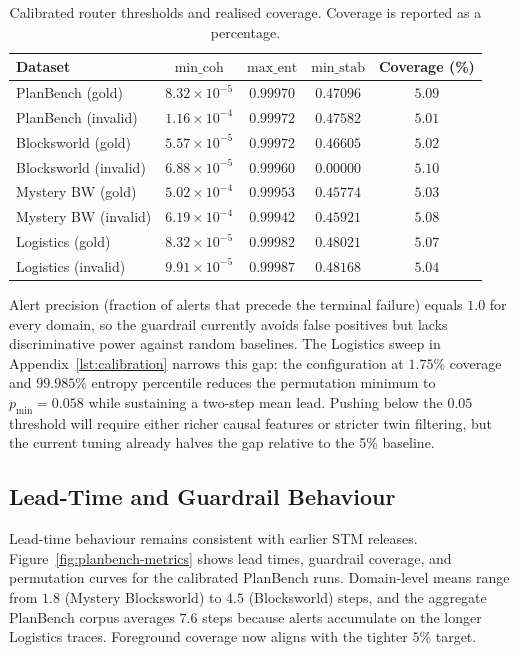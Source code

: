 \documentclass[11pt]{article}
\begin{document}
\begin{table}[h]
  \centering
  \caption{Calibrated router thresholds and realised coverage. Coverage is reported as a percentage.}
  \label{tab:coverage}
  \begin{tabular}{lcccc}
    \toprule
    Dataset & $\text{min\_coh}$ & $\text{max\_ent}$ & $\text{min\_stab}$ & Coverage (\%) \\
    \midrule
    PlanBench (gold) & $8.32\times10^{-5}$ & $0.99970$ & $0.47096$ & $5.09$ \\
    PlanBench (invalid) & $1.16\times10^{-4}$ & $0.99972$ & $0.47582$ & $5.01$ \\
    Blocksworld (gold) & $5.57\times10^{-5}$ & $0.99972$ & $0.46605$ & $5.02$ \\
    Blocksworld (invalid) & $6.88\times10^{-5}$ & $0.99960$ & $0.00000$ & $5.10$ \\
    Mystery BW (gold) & $5.02\times10^{-4}$ & $0.99953$ & $0.45774$ & $5.03$ \\
    Mystery BW (invalid) & $6.19\times10^{-4}$ & $0.99942$ & $0.45921$ & $5.08$ \\
    Logistics (gold) & $8.32\times10^{-5}$ & $0.99982$ & $0.48021$ & $5.07$ \\
    Logistics (invalid) & $9.91\times10^{-5}$ & $0.99987$ & $0.48168$ & $5.04$ \\
    \bottomrule
  \end{tabular}
\end{table}
Alert precision (fraction of alerts that precede the terminal failure) equals $1.0$ for every domain, so the guardrail currently avoids false positives but lacks discriminative power against random baselines. The Logistics sweep in
Appendix~\ref{lst:calibration} narrows this gap: the configuration at
$1.75\%$ coverage and $99.985\%$ entropy percentile reduces the permutation minimum to
$p_{\min}=0.058$ while sustaining a two-step mean lead. Pushing below the $0.05$
threshold will require either richer causal features or stricter twin filtering, but the
current tuning already halves the gap relative to the 5\% baseline.


\subsection{Lead-Time and Guardrail Behaviour}
Lead-time behaviour remains consistent with earlier STM releases. Figure~\ref{fig:planbench-metrics}
shows lead times, guardrail coverage, and permutation curves for the calibrated
PlanBench runs. Domain-level means range from $1.8$ (Mystery Blocksworld) to
$4.5$ (Blocksworld) steps, and the aggregate PlanBench corpus averages $7.6$
steps because alerts accumulate on the longer Logistics traces. Foreground
coverage now aligns with the tighter $5\%$ target.
\end{document}
